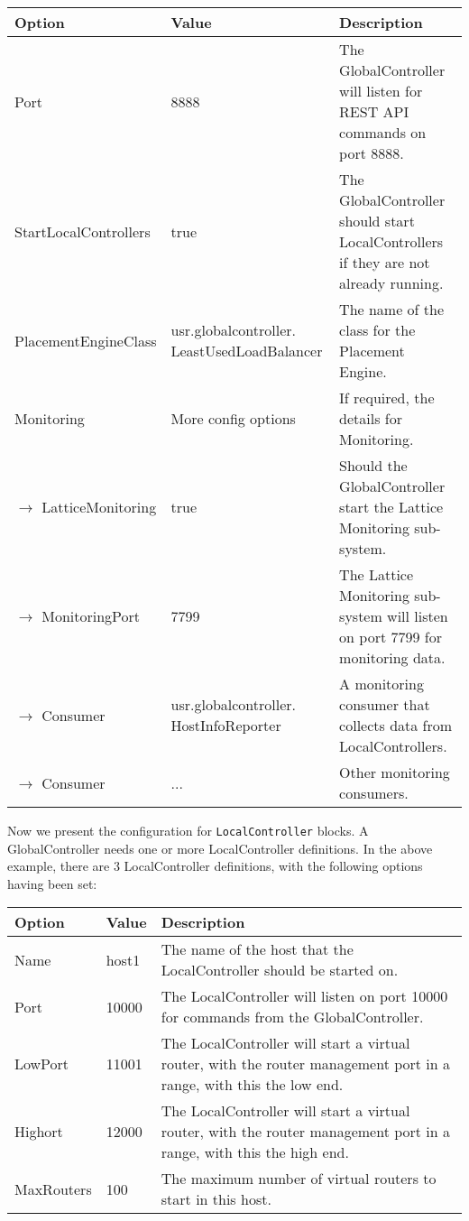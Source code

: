 {
\small

\begin{longtable}{ | p{3.4cm} | p{3.1cm} | p{7.3cm} | }

\hline
\textbf{Option} & \textbf{Value} & \textbf{Description} \\
\hline
Port & 8888 & The GlobalController will listen for REST API commands
on port 8888. \\
\hline
StartLocalControllers & true & The GlobalController should start
LocalControllers if they are not already running. \\
\hline
PlacementEngineClass & usr.globalcontroller. LeastUsedLoadBalancer &
The name of the class for the Placement Engine. \\
\hline
Monitoring & More config options & If required, the details for
Monitoring. \\
\hline
$\rightarrow$ LatticeMonitoring & true & Should the GlobalController start the Lattice
Monitoring sub-system. \\
\hline
$\rightarrow$ MonitoringPort & 7799 & The Lattice Monitoring sub-system will listen
on port 7799 for monitoring data. \\
\hline
$\rightarrow$ Consumer & usr.globalcontroller. HostInfoReporter & A monitoring
consumer that collects data from LocalControllers. \\
\hline
$\rightarrow$ Consumer & ... & Other monitoring consumers. \\
\hline

\end{longtable}

\normalsize
}

Now we present the configuration for \texttt{LocalController}
blocks.  A GlobalController needs one or more LocalController definitions.
In the above example, there are 3 LocalController definitions, with
the following  options having been set: 

{
\small

\begin{longtable}{ | p{3.4cm} | p{3.1cm} | p{7.3cm} | }

\hline
\textbf{Option} & \textbf{Value} & \textbf{Description} \\
\hline
Name & host1 & The name of the host that the LocalController should be
started on. \\
\hline
Port & 10000 & The LocalController will listen 
on port 10000 for commands from the GlobalController. \\
\hline
LowPort & 11001 & The LocalController will start a virtual router,
with the router management port in a range, with this the low end. \\
\hline
Highort & 12000 & The LocalController will start a virtual router,
with the router management port in a range, with this the high end. \\
\hline
MaxRouters & 100 & The maximum number of virtual routers to start in
this host. \\
\hline

\end{longtable}

\normalsize
}
  


